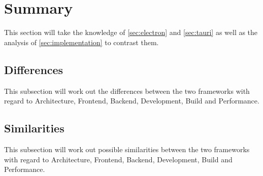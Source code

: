 \section{Summary}
\label{sec:summary}
This section will take the knowledge of \ref{sec:electron} and \ref{sec:tauri} as well as the analysis of \ref{sec:implementation} to contrast them.

\subsection{Differences}\label{subsec:differences}
This subsection will work out the differences between the two frameworks
with regard to Architecture, Frontend, Backend, Development, Build and Performance.

\subsection{Similarities}\label{subsec:similarities}
This subsection will work out possible similarities between the two frameworks with regard to Architecture, Frontend, Backend, Development, Build and Performance.